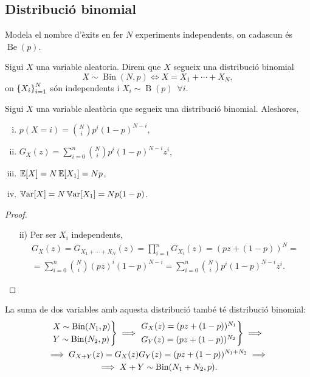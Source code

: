 \subsection*{Distribució binomial}

Modela el nombre d'èxits en fer $N$ experiments independents, on cadascun és $\operatorname{Be}(p)$.

\begin{defi}
  Sigui $X$ una variable aleatoria. Direm que $X$ segueix una distribució binomial
    \[X \sim \operatorname{Bin}(N,p) \iff X = X_1 + \cdots + X_N,\]
    on $\left\{ X_i \right\}_{i=1}^{N}$ són independents i $X_i \sim \operatorname{B}(p) \enspace\forall i$.
\end{defi}

\begin{prop}
    Sigui $X$ una variable aleatòria que segueix una distribució binomial. Aleshores,
    \begin{enumerate}[i)]
        \item $p(X=i) = \binom{N}{i}p^i(1-p)^{N-i}$,
        \item $G_X(z) = \sum_{i=0}^{n} \binom{N}{i}p^i(1-p)^{N-i}z^i$,
        \item $\operatorname{\mathbb{E}}[X] = N\operatorname{\mathbb{E}}[X_1] = Np$,
        \item $\operatorname{\mathbb{V}ar}[X] = N\operatorname{\mathbb{V}ar}[X_1] = Np(1-p)$.
    \end{enumerate}
\end{prop}

\begin{proof} %
    \begin{enumerate}[i)]
        \item[]
        \item[ii)] Per ser $X_i$ independents,
        \begin{gather*}
        G_X(z) = G_{X_1 + \cdots + X_N}(z) = \prod_{i=1}^{n}G_{X_i}(z) = (pz+(1-p))^N = \\
        = \sum_{i=0}^n \binom{N}{i}(pz)^i(1-p)^{N-i} = \sum_{i=0}^{n} \binom{N}{i}p^i(1-p)^{N-i}z^i.
        \end{gather*}
    \end{enumerate}
\end{proof}

\begin{obs} La suma de dos variables amb aquesta distribució també té distribució binomial:
    \begin{gather*}
    \begin{rcases*} X \sim \operatorname{Bin}(N_1,p) \\ Y \sim \operatorname{Bin}(N_2,p) \end{rcases*} \implies
    \begin{rcases*} G_X(z) = (pz+(1-p))^{N_1} \\ G_Y(z) = (pz+(1-p))^{N_2} \end{rcases*}
    \implies \\
    \implies G_{X+Y}(z) = G_X(z)G_Y(z) = (pz+(1-p))^{N_1+N_2} \implies \\
    \implies X+Y \sim \operatorname{Bin}(N_1+N_2,p).
    \end{gather*}
\end{obs}

